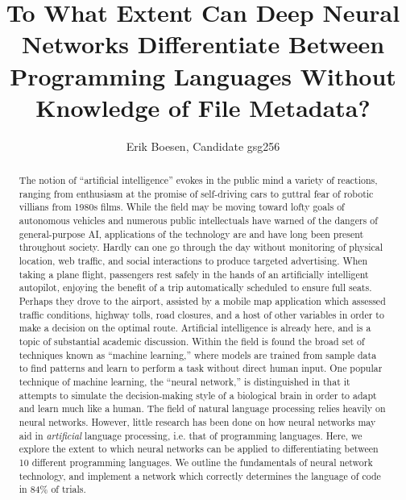 \documentclass{article}
\begin{document}
\title{To What Extent Can Deep Neural Networks Differentiate Between Programming Languages Without Knowledge of File Metadata?}
\author{Erik Boesen, Candidate gsg256}

\begin{titlingpage}
\maketitle

\begin{abstract}
    The notion of ``artificial intelligence'' evokes in the public mind a variety of reactions, ranging from enthusiasm at the promise of self-driving cars to guttral fear of robotic villians from 1980s films. While the field may be moving toward lofty goals of autonomous vehicles and numerous public intellectuals have warned of the dangers of general-purpose AI, applications of the technology are and have long been present throughout society. Hardly can one go through the day without monitoring of physical location, web traffic, and social interactions to produce targeted advertising. When taking a plane flight, passengers rest safely in the hands of an artificially intelligent autopilot, enjoying the benefit of a trip automatically scheduled to ensure full seats. Perhaps they drove to the airport, assisted by a mobile map application which assessed traffic conditions, highway tolls, road closures, and a host of other variables in order to make a decision on the optimal route. Artificial intelligence is already here, and is a topic of substantial academic discussion. Within the field is found the broad set of techniques known as ``machine learning,'' where models are trained from sample data to find patterns and learn to perform a task without direct human input. One popular technique of machine learning, the ``neural network,'' is distinguished in that it attempts to simulate the decision-making style of a biological brain in order to adapt and learn much like a human. The field of natural language processing relies heavily on neural networks. However, little research has been done on how neural networks may aid in \textit{artificial} language processing, i.e. that of programming languages. Here, we explore the extent to which neural networks can be applied to differentiating between 10 different programming languages. We outline the fundamentals of neural network technology, and implement a network which correctly determines the language of code in 84\% of trials.
\end{abstract}
\end{titlingpage}
\end{document}
